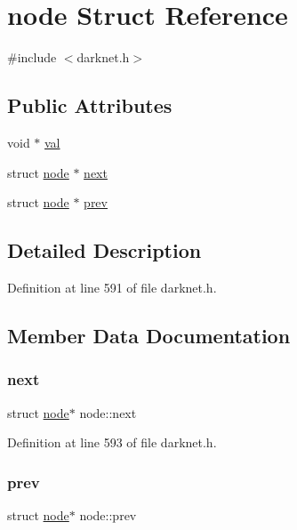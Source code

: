 \hypertarget{structnode}{}\section{node Struct Reference}
\label{structnode}


{\ttfamily \#include $<$darknet.\+h$>$}

\subsection*{Public Attributes}
\begin{DoxyCompactItemize}
\item 
void $\ast$ \mbox{\hyperlink{structnode_a3866f55c05d50265b730d8cdeec0a1f8}{val}}
\item 
struct \mbox{\hyperlink{structnode}{node}} $\ast$ \mbox{\hyperlink{structnode_aa3e8aa83f864292b5a01210f4453fcc0}{next}}
\item 
struct \mbox{\hyperlink{structnode}{node}} $\ast$ \mbox{\hyperlink{structnode_a7ee3d227c728ce18a86e43ebc301046e}{prev}}
\end{DoxyCompactItemize}


\subsection{Detailed Description}


Definition at line 591 of file darknet.\+h.



\subsection{Member Data Documentation}
\mbox{\label{structnode_aa3e8aa83f864292b5a01210f4453fcc0}} 
\subsubsection{\texorpdfstring{next}{next}}
{\footnotesize\ttfamily struct \mbox{\hyperlink{structnode}{node}}$\ast$ node\+::next}



Definition at line 593 of file darknet.\+h.

\mbox{\label{structnode_a7ee3d227c728ce18a86e43ebc301046e}} 
\subsubsection{\texorpdfstring{prev}{prev}}
{\footnotesize\ttfamily struct \mbox{\hyperlink{structnode}{node}}$\ast$ node\+::prev}




